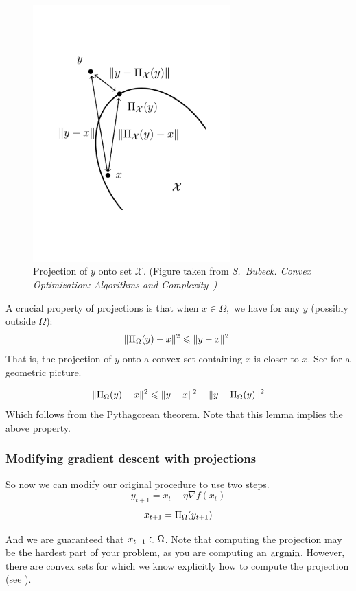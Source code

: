 \begin{figure}
\begin{center}
\includegraphics[width=3in]{figures/lecture2-projection}
\end{center}
\caption{Projection of $y$ onto set $\mathcal{X}$. (Figure taken from \em{S.~Bubeck.
Convex Optimization: Algorithms and Complexity}~\cite{Bubeck}) }
\end{figure}

A crucial property of projections is that when $x\in\Omega,$ we have for any $y$
(possibly outside $\Omega$):
\[
\| \Pi_{\Omega}(y) - x \|^2 \leqslant \| y - x \|^2\
\]
That is, the projection of $y$ onto a convex set containing $x$ is closer to $x$. See  for a geometric picture.

\begin{lemma}
\[
\| \Pi_{\Omega}(y) - x \|^2 \leqslant \| y - x \|^2 - \| y - \Pi_{\Omega}(y) \|^2
\]
Which follows from the Pythagorean theorem. Note that this lemma implies the above property.
\end{lemma}

\subsubsection{Modifying gradient descent with projections}

So now we can modify our original procedure to use two steps.
\[
y_{t+1} = x_t - \eta \nabla f(x_t)
\]
\[
x_{t+1} = \Pi_{\Omega}(y_{t+1})
\]

And we are guaranteed that $x_{t+1}\in\Omega$. Note that computing the
projection may be the hardest part of your problem, as you are computing an
$\operatorname*{\arg\!\min}$. However, there are convex sets for which we know explicitly how to
compute the projection (see \exampleref{euclidean-ball}).


